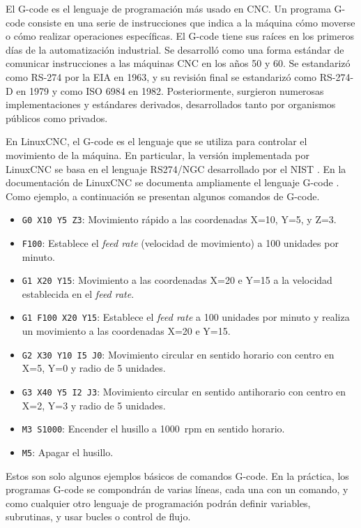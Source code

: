 \documentclass[english,spanish,a4paper,11pt]{article}
\begin{document}
El G-code es el lenguaje de programación más usado en \ac{CNC}. Un programa G-code consiste en una serie de instrucciones que indica a la máquina cómo moverse o cómo realizar operaciones específicas. El G-code tiene sus raíces en los primeros días de la automatización industrial. Se desarrolló como una forma estándar de comunicar instrucciones a las máquinas \ac{CNC} en los años 50 y 60. Se estandarizó como RS-274 por la \ac{EIA} en 1963, y su revisión final se estandarizó como RS-274-D en 1979 y como ISO 6984 en 1982. Posteriormente, surgieron numerosas implementaciones y estándares derivados, desarrollados tanto por organismos públicos como privados.

En LinuxCNC, el G-code es el lenguaje que se utiliza para controlar el movimiento de la máquina. En particular, la versión implementada por LinuxCNC se basa en el lenguaje RS274/NGC desarrollado por el \ac{NIST} \cite{RS274NGC}. En la documentación de LinuxCNC se documenta ampliamente el lenguaje G-code \cite[sección G-code Programming]{linuxcncdoc}. Como ejemplo, a continuación se presentan algunos comandos de G-code.
%
\begin{itemize}
    \item \texttt{G0 X10 Y5 Z3}: Movimiento rápido a las coordenadas X=10, Y=5, y Z=3.
    \item \texttt{F100}: Establece el \textit{feed rate} (velocidad de movimiento) a 100 unidades por minuto.
    \item \texttt{G1 X20 Y15}: Movimiento a las coordenadas X=20 e Y=15 a la velocidad establecida en el \textit{feed rate}.
    \item \texttt{G1 F100 X20 Y15}: Establece el \textit{feed rate} a 100 unidades por minuto y realiza un movimiento a las coordenadas X=20 e Y=15.
    \item \texttt{G2 X30 Y10 I5 J0}: Movimiento circular en sentido horario con centro en X=5, Y=0 y radio de 5 unidades.
    \item \texttt{G3 X40 Y5 I2 J3}: Movimiento circular en sentido antihorario con centro en X=2, Y=3 y radio de 5 unidades.
    \item \texttt{M3 S1000}: Encender el husillo a \qty{1000}{rpm} en sentido horario.
    \item \texttt{M5}: Apagar el husillo.
\end{itemize}

Estos son solo algunos ejemplos básicos de comandos G-code. En la práctica, los programas G-code se compondrán de varias líneas, cada una con un comando, y como cualquier otro lenguaje de programación podrán definir variables, subrutinas, y usar bucles o control de flujo.
\end{document}
